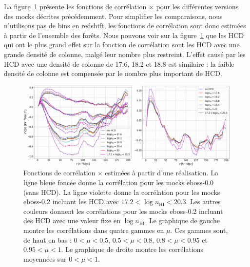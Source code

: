 La figure~\ref{fig:cf_nhi_bins} présente les fonctions de corrélation \lya{}$\times$\lya{} pour les différentes versions des mocks décrites précédemment. Pour simplifier les comparaisons, nous n'utilisons pas de bins en redshift, les fonctions de corrélation sont donc estimées à partir de l'ensemble des forêts.
Nous pouvons voir sur la figure~\ref{fig:cf_nhi_bins} que les HCD qui ont le plus grand effet sur la fonction de corrélation sont les HCD avec une grande densité de colonne, malgé leur nombre plus restreint. L'effet causé par les HCD avec une densité de colonne de \num{17.6}, \num{18.2} et \num{18.8} est similaire : la faible densité de colonne est compensée par le nombre plus important de HCD.

\begin{figure}
  \centering
  \includegraphics[scale=0.35]{cf_nhi_bins}
  \caption{Fonctions de corrélation \lya{}$\times$\lya{} estimées à partir d'une réalisation.
    La ligne bleue foncée donne la corrélation pour les mocks eboss-0.0 (sans HCD). La ligne violette donne la corrélation pour les mocks eboss-0.2 incluant les HCD avec $\num{17.2} < \log n_{\mathrm{HI}} < \num{20.3}$. Les autres couleurs donnent les corrélations pour les mocks eboss-0.2 incluant des HCD avec une valeur fixe en $\log n_{\mathrm{HI}}$.
    Le graphique de gauche montre les corrélations dans quatre gammes en $\mu$. Ces gammes sont, de haut en bas : $\num{0}<\mu<\num{0.5}$, $\num{0.5}<\mu<\num{0.8}$, $\num{0.8}<\mu<\num{0.95}$ et $\num{0.95}<\mu<\num{1}$. Le graphique de droite montre les corrélations moyennées sur $\num{0} < \mu < \num{1}$.}
  \label{fig:cf_nhi_bins}
\end{figure}

